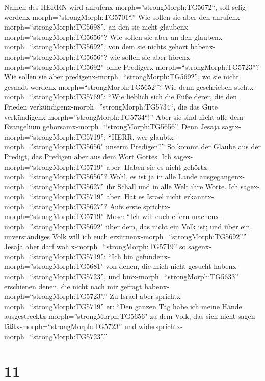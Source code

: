 Namen des HERRN wird anrufenx-morph=''strongMorph:TG5672``, soll selig
werdenx-morph=''strongMorph:TG5701``.''  Wie sollen sie
aber den anrufenx-morph=``strongMorph:TG5698'', an den sie nicht
glaubenx-morph=``strongMorph:TG5656''? Wie sollen sie aber an den
glaubenx-morph=``strongMorph:TG5692'', von dem sie nichts gehört
habenx-morph=``strongMorph:TG5656''? wie sollen sie aber
hörenx-morph=``strongMorph:TG5692'' ohne
Predigerx-morph=``strongMorph:TG5723''?  Wie sollen sie
aber predigenx-morph=``strongMorph:TG5692'', wo sie nicht gesandt
werdenx-morph=``strongMorph:TG5652''? Wie denn geschrieben
stehtx-morph=``strongMorph:TG5769'': ``Wie lieblich sich die Füße derer,
die den Frieden verkündigenx-morph=''strongMorph:TG5734``, die das Gute
verkündigenx-morph=''strongMorph:TG5734``!''  Aber sie sind
nicht alle dem Evangelium gehorsamx-morph=``strongMorph:TG5656''. Denn
Jesaja sagtx-morph=``strongMorph:TG5719'': ``HERR, wer
glaubtx-morph=''strongMorph:TG5656" unserm Predigen?''  So
kommt der Glaube aus der Predigt, das Predigen aber aus dem Wort Gottes.
 Ich sagex-morph=``strongMorph:TG5719'' aber: Haben sie es
nicht gehörtx-morph=``strongMorph:TG5656''? Wohl, es ist ja in alle
Lande ausgegangenx-morph=``strongMorph:TG5627'' ihr Schall und in alle
Welt ihre Worte.  Ich sagex-morph=``strongMorph:TG5719''
aber: Hat es Israel nicht erkanntx-morph=``strongMorph:TG5627''? Aufs
erste sprichtx-morph=``strongMorph:TG5719'' Mose: ``Ich will euch eifern
machenx-morph=''strongMorph:TG5692" über dem, das nicht ein Volk ist;
und über ein unverständiges Volk will ich euch
erzürnenx-morph=``strongMorph:TG5692''.''  Jesaja aber darf
wohlx-morph=``strongMorph:TG5719'' so
sagenx-morph=``strongMorph:TG5719'': ``Ich bin
gefundenx-morph=''strongMorph:TG5681" von denen, die mich nicht gesucht
habenx-morph=``strongMorph:TG5723'', und
binx-morph=``strongMorph:TG5633'' erschienen denen, die nicht nach mir
gefragt habenx-morph=``strongMorph:TG5723''.''  Zu Israel
aber sprichtx-morph=``strongMorph:TG5719'' er: ``Den ganzen Tag habe ich
meine Hände ausgestrecktx-morph=''strongMorph:TG5656" zu dem Volk, das
sich nicht sagen läßtx-morph=``strongMorph:TG5723'' und
widersprichtx-morph=``strongMorph:TG5723''.''

\hypertarget{section-10}{%
\section{11}\label{section-10}}

